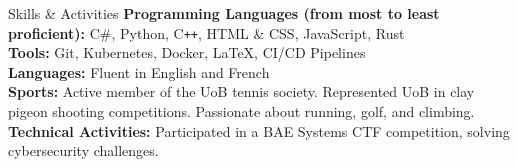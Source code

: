 \documentclass{resume} %
\begin{document}

\begin{rSection}{Skills \& Activities}
\textbf{Programming Languages (from most to least proficient):} C\#, Python, C\texttt{++}, HTML \& CSS, JavaScript, Rust \\
\textbf{Tools:} Git, Kubernetes, Docker, LaTeX, CI/CD Pipelines \\
\textbf{Languages:} Fluent in English and French \\
\textbf{Sports:} Active member of the UoB tennis society. Represented UoB in clay pigeon shooting competitions. Passionate about running, golf, and climbing. \\
\textbf{Technical Activities:} Participated in a BAE Systems CTF competition, solving cybersecurity challenges.

\end{rSection}
\end{document}

